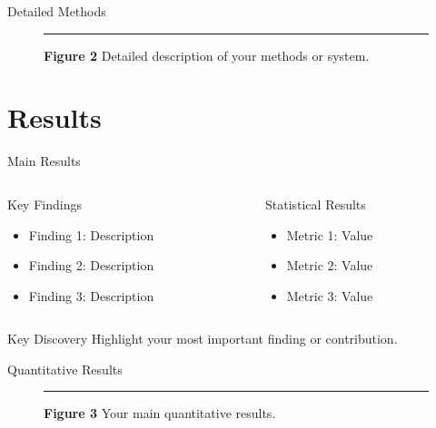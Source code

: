 \documentclass[aspectratio=169]{beamer}
\begin{document}
\begin{frame}{Detailed Methods}
  \begin{figure}
    \centering
    \rule{0.8\textwidth}{0.5\textheight} %
    {\small \textbf{Figure 2} \textbar{} Detailed description of your methods or system.}
  \end{figure}
\end{frame}

\section{Results}

\begin{frame}{Main Results}
  \begin{columns}[T]
    \begin{column}{0.48\textwidth}
      \begin{block}{Key Findings}
        \begin{itemize}
          \item Finding 1: Description
          \item Finding 2: Description
          \item Finding 3: Description
        \end{itemize}
      \end{block}
    \end{column}
    \begin{column}{0.48\textwidth}
      \begin{block}{Statistical Results}
        \begin{itemize}
          \item Metric 1: Value
          \item Metric 2: Value
          \item Metric 3: Value
        \end{itemize}
      \end{block}
    \end{column}
  \end{columns}
  
  \vspace{0.3cm}
  \begin{alertblock}{Key Discovery}
    Highlight your most important finding or contribution.
  \end{alertblock}
\end{frame}

\begin{frame}{Quantitative Results}
  \begin{figure}
    \centering
    \rule{0.8\textwidth}{0.5\textheight} %
    {\small \textbf{Figure 3} \textbar{} Your main quantitative results.}
  \end{figure}
\end{frame}
\end{document}
